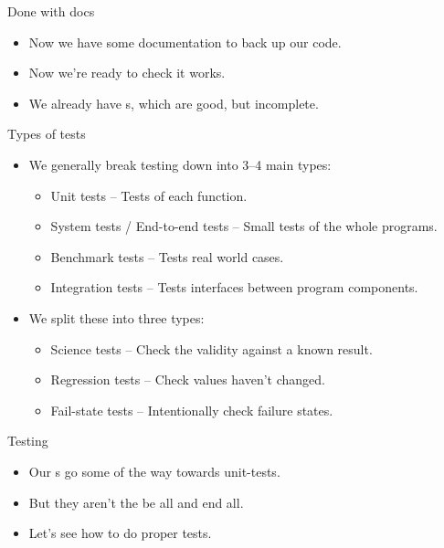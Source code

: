 \documentclass[usenames,dvipsnames]{beamer}
\newcommand{\kw}[1]{\texttt{\detokenize{#1}}}
\begin{document}
\begin{frame}{Done with docs}
    \begin{itemize}[<+->]
        \item{}Now we have some documentation to back up our code.
        \item{}Now we're ready to check it works.
        \item{}We already have \kw{doctest}s, which are good, but incomplete.
    \end{itemize}
\end{frame}

\begin{frame}{Types of tests}
    \begin{itemize}[<+->]
        \item{}We generally break testing down into 3--4 main types:
        \begin{itemize}
            \item{}Unit tests -- Tests of each function.
            \item{}System tests / End-to-end tests -- Small tests of the whole programs.
            \item{}Benchmark tests -- Tests real world cases.
            \item{}Integration tests -- Tests interfaces between program components.
        \end{itemize}
        \item{}We split these into three types:
        \begin{itemize}
            \item{}Science tests -- Check the validity against a known result.
            \item{}Regression tests -- Check values haven't changed.
            \item{}Fail-state tests -- Intentionally check failure states.
        \end{itemize}
    \end{itemize}
\end{frame}

\begin{frame}{Testing}
    \begin{itemize}[<+->]
        \item{}Our \kw{doctest}s go some of the way towards unit-tests.
        \item{}But they aren't the be all and end all.
        \item{}Let's see how to do proper tests.
    \end{itemize}
\end{frame}
\end{document}
